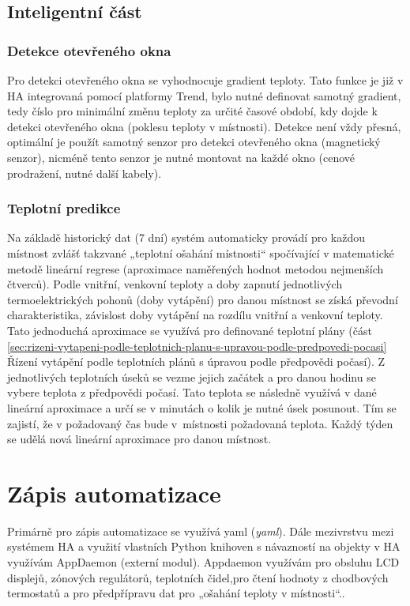 \subsection{Inteligentní část}
\subsubsection{Detekce otevřeného okna}
\label{sec:detekce-otevreneho-okna}
Pro detekci otevřeného okna se vyhodnocuje gradient teploty. Tato funkce je již v HA integrovaná pomocí platformy Trend, bylo nutné definovat samotný gradient, tedy číslo pro minimální změnu teploty za určité časové období, kdy dojde k detekci otevřeného okna (poklesu teploty v místnosti). Detekce není vždy přesná, optimální je použít samotný senzor pro detekci otevřeného okna (magnetický senzor), nicméně tento senzor je nutné montovat na každé okno (cenové prodražení, nutné další kabely).

\subsubsection{Teplotní predikce}
\label{sec:teplotni-predikce}
Na základě historický dat (7 dní) systém automaticky provádí pro každou místnost zvlášť takzvané „teplotní ošahání místnosti“ spočívající v matematické metodě lineární regrese (aproximace naměřených hodnot metodou nejmenších čtverců). Podle vnitřní, venkovní teploty a doby zapnutí jednotlivých termoelektrických pohonů (doby vytápění) pro danou místnost se získá převodní charakteristika, závislost doby vytápění na rozdílu vnitřní a venkovní teploty. Tato jednoduchá aproximace se využívá pro definované teplotní plány (část \ref{sec:rizeni-vytapeni-podle-teplotnich-planu-s-upravou-podle-predpovedi-pocasi} Řízení vytápění podle teplotních plánů s úpravou podle předpovědi počasí). Z jednotlivých teplotních úseků se vezme jejich začátek a pro danou hodinu se vybere teplota z předpovědi počasí. Tato teplota se následně využívá v dané lineární aproximace a určí se v minutách o kolik je nutné úsek posunout. Tím se zajistí, že v požadovaný čas bude v~místnosti požadovaná teplota. Každý týden se udělá nová lineární aproximace pro danou místnost.


\section{Zápis automatizace}
Primárně pro zápis automatizace se využívá \acrshort{yaml} (\textit{\acrlong{yaml}}). Dále mezivrstvu mezi systémem HA a využití vlastních Python knihoven s návazností na objekty v HA využívám AppDaemon (externí modul). Appdaemon využívám pro obsluhu LCD displejů, zónových regulátorů, teplotních čidel,pro čtení hodnoty z chodbových termostatů a pro předpřípravu dat pro „ošahání teploty v místnosti“.. 

